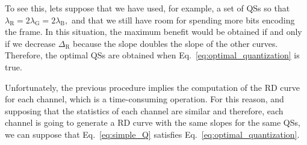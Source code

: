 To see this, lets suppose that we have used, for example, a set of QSs
so that
$\lambda_{\text{R}} = 2\lambda_{\text{G}} = 2\lambda_{\text{B}},$ and
that we still have room for spending more bits encoding the frame. In
this situation, the maximum benefit would be obtained if and only if
we decrease $\Delta_{\text{R}}$ because the slope doubles the slope
of the other curves. Therefore, the optimal QSs are obtained when
Eq.~\ref{eq:optimal_quantization} is true.

\begin{comment}
Thus, the optimal QSs should
operate in the curves with the same RD slope,
\begin{equation}
  \lambda_{\text{R}} = \lambda_{\text{G}} = \lambda_{\text{B}},
  \label{eq:optimal_quantization}
\end{equation}
for a given total bit-rate $R$, which implies that the contribution of each channel (the ratio between
quality and bit-rate) to the quality of $\tilde{x}$ has been highest
possible~\cite{vetterli1995wavelets,sayood2017introduction}.
\end{comment}

Unfortunately, the previous procedure implies the computation of the
RD curve for each channel, which is a time-consuming operation. For
this reason, and supposing that the statistics of each channel are
similar and therefore, each channel is going to generate a RD curve
with the same slopes for the same QSs, we can suppose that
Eq.~\ref{eq:simple_Q} satisfies Eq.~\ref{eq:optimal_quantization}.

